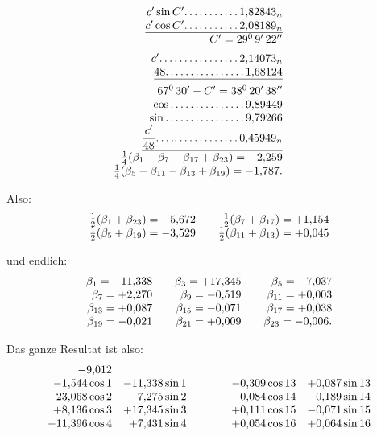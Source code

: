 \begin{landscape}
\[\begin{array}{@{}r@{\qquad}r@{\qquad}r@{}}
\begin{array}[t]{@{}r@{}}
c'\sin C'\VfourDots{10}1{,}82843_n\\
\underline{c'\cos C'\VfourDots{10}2{,}08189_n}\\
C'=29^0\,9'\,22''\\[5pt]
c'\VfourDots{15}2{,}14073_n\\
\underline{48\VfourDots{15}1{,}68124}\\[5pt]
67^0\,30'-C'=38^0\,20'\,38''\\
\cos\VfourDots{14}9{,}89449\\
\sin\VfourDots{15}9{,}79266\\
\underline{\dfrac{c'}{48}\VfourDots{2}\mathord{.}\mkern0.5mu\mathord{.}\,\VfourDots{11}0{,}45949_n}\\[5pt]
\tfrac14(\beta_1+\beta_7+\beta_{17}+\beta_{23})=-2{,}259\\
\tfrac14(\beta_5-\beta_{11}-\beta_{13}+\beta_{19})=-1{,}787.
\end{array}
\end{array}
\]
\par\noindent Also:
\[
\begin{array}{@{}r@{\qquad}r@{}}
\tfrac12(\beta_1+\beta_{23})=-5{,}672&\tfrac12(\beta_7+\beta_{17})=+1{,}154\\
\tfrac12(\beta_5+\beta_{19})=-3{,}529&\tfrac12(\beta_{11}+\beta_{13})=+0{,}045
\end{array}
\]
\par\noindent und endlich:
\[
\begin{array}{@{}r@{\qquad}r@{\qquad}r@{}}
\beta_1=-11{,}338&\beta_3=+17{,}345&\beta_5=-7{,}037\\
\beta_7=+2{,}270&\beta_9=-0{,}519&\beta_{11}=+0{,}003\\
\beta_{13}=+0{,}087&\beta_{15}=-0{,}071&\beta_{17}=+0{,}038\\
\beta_{19}=-0{,}021&\beta_{21}=+0{,}009&\beta_{23}=-0{,}006.
\end{array}
\]
\par\noindent Das ganze Resultat ist also:
\[
\begin{array}{@{}r@{\quad}r@{\qquad\qquad}r@{\quad}r@{}}
-9{,}012&&&\\
-1{,}544\cos 1&-11{,}338\sin 1&-0{,}309\cos 13&+0{,}087\sin 13\\
+23{,}068\cos 2&-7{,}275\sin 2&-0{,}084\cos 14&-0{,}189\sin 14\\
+8{,}136\cos 3&+17{,}345\sin 3&+0{,}111\cos 15&-0{,}071\sin 15\\
-11{,}396\cos 4&+7{,}431\sin 4&+0{,}054\cos 16&+0{,}064\sin 16\\

\end{array}\]
\end{landscape}
